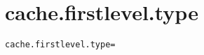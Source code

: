 \section{cache.firstlevel.type}
\label{configuration:CacheFirstlevelType}
\ClearAPI
\TODO
{}
\begin{lstlisting}[style=Props,caption={Usage example for \textit{cache.firstlevel.type}}]
cache.firstlevel.type=
\end{lstlisting}